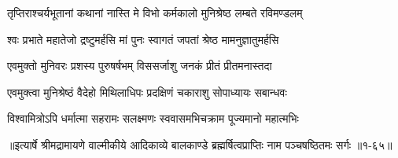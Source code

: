 \twolineshloka
{तृप्तिराश्चर्यभूतानां कथानां नास्ति मे विभो}
{कर्मकालो मुनिश्रेष्ठ लम्बते रविमण्डलम्} %

\twolineshloka
{श्वः प्रभाते महातेजो द्रष्टुमर्हसि मां पुनः}
{स्वागतं जपतां श्रेष्ठ मामनुज्ञातुमर्हसि} %

\twolineshloka
{एवमुक्तो मुनिवरः प्रशस्य पुरुषर्षभम्}
{विससर्जाशु जनकं प्रीतं प्रीतमनास्तदा} %

\twolineshloka
{एवमुक्त्वा मुनिश्रेष्ठं वैदेहो मिथिलाधिपः}
{प्रदक्षिणं चकाराशु सोपाध्यायः सबान्धवः} %

\twolineshloka
{विश्वामित्रोऽपि धर्मात्मा सहरामः सलक्ष्मणः}
{स्ववासमभिचक्राम पूज्यमानो महात्मभिः} %


॥इत्यार्षे श्रीमद्रामायणे वाल्मीकीये आदिकाव्ये बालकाण्डे ब्रह्मर्षित्वप्राप्तिः नाम पञ्चषष्ठितमः सर्गः ॥१-६५॥
